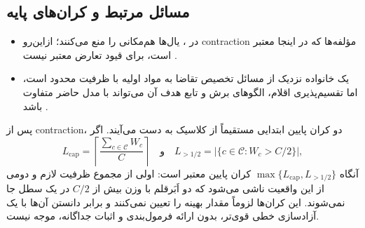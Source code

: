 \subsection{مسائل مرتبط و کران‌های پایه}\label{subsec:32}
\begin{itemize}
    \item در ، یال‌ها هم‌مکانی را منع می‌کنند؛ ازاین‌رو contraction مؤلفه‌ها که در اینجا معتبر است، برای قیود تعارض معتبر نیست \cite{A1_Bacci2017,A2_DoronArad2020}.
    \item {} یک خانواده نزدیک از مسائل تخصیص تقاضا به مواد اولیه با ظرفیت محدود است، اما تقسیم‌پذیری اقلام، الگوهای برش و تابع هدف آن می‌تواند با مدل حاضر متفاوت باشد \cite{D1_Tanir2016}.
\end{itemize}

پس از contraction، دو کران پایین ابتدایی مستقیماً از  کلاسیک به دست می‌آیند. اگر
\[
    L_{\mathrm{cap}}=\left\lceil\frac{\sum_{c\in\mathcal{C}}W_c}{C}\right\rceil
    \quad\text{و}\quad
    L_{>1/2}=\left|\{c\in\mathcal{C}:W_c>C/2\}\right|,
\]
آنگاه $\max\{L_{\mathrm{cap}},L_{>1/2}\}$ کران پایین معتبر است: اولی از مجموع ظرفیت لازم و دومی از این واقعیت ناشی می‌شود که دو اَبَرقلم با وزن بیش از $C/2$ در یک سطل جا نمی‌شوند. این کران‌ها لزوماً مقدار بهینه را تعیین نمی‌کنند و برابر دانستن آن‌ها با یک آزادسازی خطی قوی‌تر، بدون ارائه فرمول‌بندی و اثبات جداگانه، موجه نیست.

